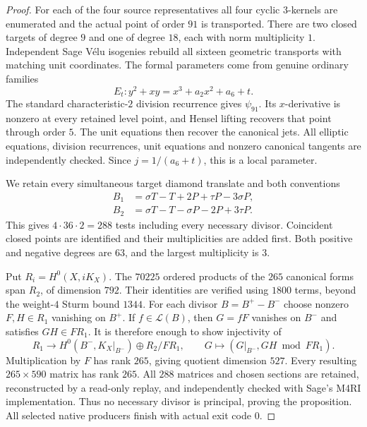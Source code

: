 \begin{proof}
For each of the four source representatives all four cyclic $3$-kernels are enumerated and the actual point of order $91$ is transported. There are two closed targets of degree $9$ and one of degree $18$, each with norm multiplicity $1$. Independent Sage V\'elu isogenies rebuild all sixteen geometric transports with matching unit coordinates. The formal parameters come from genuine ordinary families
\[
 E_t:y^2+xy=x^3+a_2x^2+a_6+t.
\]
The standard characteristic-$2$ division recurrence gives $\psi_{91}$. Its $x$-derivative is nonzero at every retained level point, and Hensel lifting recovers that point through order $5$. The unit equations then recover the canonical jets. All elliptic equations, division recurrences, unit equations and nonzero canonical tangents are independently checked. Since $j=1/(a_6+t)$, this is a local parameter.

We retain every simultaneous target diamond translate and both conventions
\[
 \begin{split}
 B_1&=\sigma T-T+2P+\tau P-3\sigma P,\\
 B_2&=\sigma T-T-\sigma P-2P+3\tau P.
 \end{split}
\]
This gives $4\cdot36\cdot2=288$ tests including every necessary divisor. Coincident closed points are identified and their multiplicities are added first. Both positive and negative degrees are $63$, and the largest multiplicity is $3$.

Put $R_i=H^0(X,iK_X)$. The $70225$ ordered products of the $265$ canonical forms span $R_2$, of dimension $792$. Their identities are verified using $1800$ terms, beyond the weight-$4$ Sturm bound $1344$. For each divisor $B=B^+-B^-$ choose nonzero $F,H\in R_1$ vanishing on $B^+$. If $f\in\mathcal L(B)$, then $G=fF$ vanishes on $B^-$ and satisfies $GH\in FR_1$. It is therefore enough to show injectivity of
\[
 R_1\longrightarrow H^0(B^-,K_X|_{B^-})\oplus R_2/FR_1,
 \qquad G\longmapsto(G|_{B^-},GH\bmod FR_1).
\]
Multiplication by $F$ has rank $265$, giving quotient dimension $527$. Every resulting $265\times590$ matrix has rank $265$. All $288$ matrices and chosen sections are retained, reconstructed by a read-only replay, and independently checked with Sage's M4RI implementation. Thus no necessary divisor is principal, proving the proposition. All selected native producers finish with actual exit code $0$.
\end{proof}
